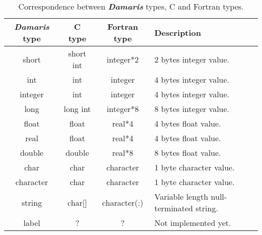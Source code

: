 \documentclass[11pt]{report}
\newcommand{\Damaris}{\emph{\textbf{Damaris}}}
\begin{document}
\begin{table}[h]
\centering
   \begin{tabular}{|c|c|c|l|}
      \hline
      \Damaris{} type & C type & Fortran type & Description \\
      \hline
short & short int & integer*2 &
                    2 bytes integer value.\\
int & int & integer &
                    4 bytes integer value.\\
integer & int & integer &
                    4 bytes integer value.\\
long & long int & integer*8 &
                    8 bytes integer value.\\
float & float & real*4 &
                    4 bytes float value.\\
real & float & real*4 &
                    4 bytes float value.\\
double & double & real*8 &
                    8 bytes float value.\\
char & char & character &
                    1 byte character value.\\
character & char & character &
                    1 byte character value.\\
string & char[] & character(:) &
                    Variable length null-terminated string.\\
label & ? & ? &
                    Not implemented yet.\\
                    \hline
   \end{tabular}
   \caption{Correspondence between \Damaris{} types, C and Fortran types.}
\end{table}

\printindex
\end{document}
